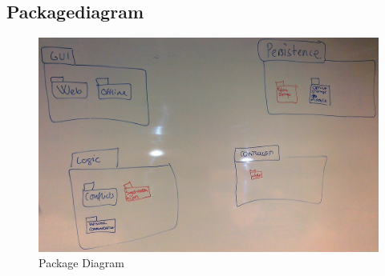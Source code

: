 \subsection{Packagediagram}
\begin{figure}[h!]
  \includegraphics[width=\textwidth,natwidth=2631,natheight=1660]{illustrations/PackageDiagram.jpg}
  \caption{Package Diagram}
\end{figure}
